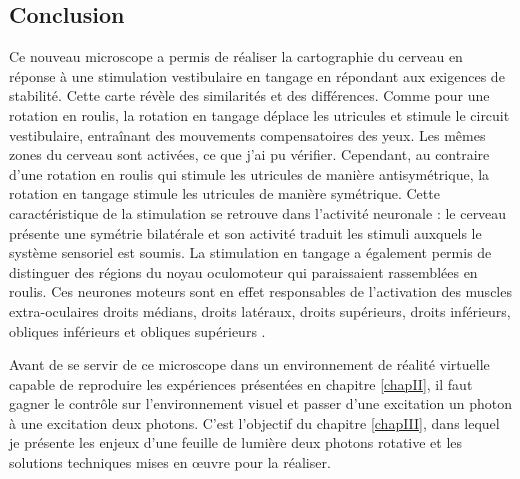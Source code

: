 \subsection{Conclusion}

Ce nouveau microscope a permis de réaliser la cartographie du cerveau en réponse à une stimulation vestibulaire en tangage en répondant aux exigences de stabilité. Cette carte révèle des similarités et des différences. Comme pour une rotation en roulis, la rotation en tangage déplace les utricules et stimule le circuit vestibulaire, entraînant des mouvements compensatoires des yeux. Les mêmes zones du cerveau sont activées, ce que j'ai pu vérifier. Cependant, au contraire d'une rotation en roulis qui stimule les utricules de manière antisymétrique, la rotation en tangage stimule les utricules de manière symétrique. Cette caractéristique de la stimulation se retrouve dans l'activité neuronale : le cerveau présente une symétrie bilatérale et son activité traduit les stimuli auxquels le système sensoriel est soumis. La stimulation en tangage a également permis de distinguer des régions du noyau oculomoteur qui paraissaient rassemblées en roulis. Ces neurones moteurs sont en effet responsables de l'activation des muscles extra-oculaires droits médians, droits latéraux, droits supérieurs, droits inférieurs, obliques inférieurs et obliques supérieurs \cite{straka_vestibular_2013}\cite{straka_connecting_2014}.

Avant de se servir de ce microscope dans un environnement de réalité virtuelle capable de reproduire les expériences présentées en chapitre \ref{chapII}, il faut gagner le contrôle sur l'environnement visuel et passer d'une excitation un photon à une excitation deux photons. C'est l'objectif du chapitre \ref{chapIII}, dans lequel je présente les enjeux d'une feuille de lumière deux photons rotative et les solutions techniques mises en œuvre pour la réaliser.